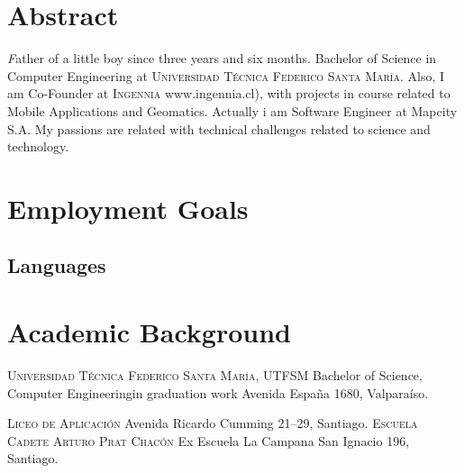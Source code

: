 \documentclass[11pt,letterpaper,roman]{moderncv}
\begin{document}
\maketitle

\section*{\textbf{Abstract}} 
	\textsl Father of a little boy since three years
	and six months. Bachelor of Science in Computer Engineering at
	\textsc{Universidad Técnica Federico Santa María}. Also, I am Co-Founder at
	\textsc{Ingennia} www.ingennia.cl), with projects in course related to Mobile
	Applications and Geomatics. Actually i am Software Engineer at Mapcity S.A. My passions are related with technical challenges
	related to science and technology.
\section{Employment Goals}

\subsection{Languages} 


\section{Academic Background}
	{\textsc{Universidad T\'ecnica Federico Santa Mar\'ia, UTFSM}}
	{Bachelor of Science, Computer Engineering}{in graduation work}
	{}
	{Avenida España 1680, Valparaíso.}

	{\textsc{Liceo de Aplicaci\'on}}
	{}
	{}
	{}
	{Avenida Ricardo Cumming 21--29, Santiago.}
	{\textsc{Escuela Cadete Arturo Prat Chac\'on}}
	{Ex Escuela La Campana}
	{}
	{}
	{San Ignacio 196, Santiago.}
\end{document}
